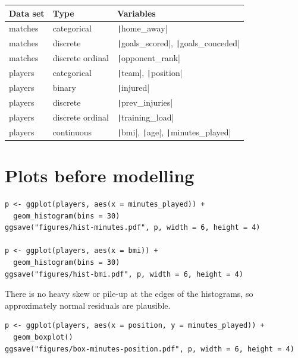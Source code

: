 \documentclass[12pt,notitlepage]{report}
\begin{document}
\begin{center}
  \begin{tabular}{lll}
    Data set & Type & Variables \\
    \toprule
    matches & categorical      & \texttt|home_away| \\
    matches & discrete         & \texttt|goals_scored|, \texttt|goals_conceded| \\
    matches & discrete ordinal & \texttt|opponent_rank| \\
    players & categorical      & \texttt|team|, \texttt|position| \\
    players & binary           & \texttt|injured| \\
    players & discrete         & \texttt|prev_injuries| \\
    players & discrete ordinal & \texttt|training_load| \\
    players & continuous       & \texttt|bmi|, \texttt|age|, \texttt|minutes_played| \\
  \end{tabular}
\end{center}

\section{Plots before modelling}

\begin{verbatim}
p <- ggplot(players, aes(x = minutes_played)) +
  geom_histogram(bins = 30)
ggsave("figures/hist-minutes.pdf", p, width = 6, height = 4)

p <- ggplot(players, aes(x = bmi)) +
  geom_histogram(bins = 30)
ggsave("figures/hist-bmi.pdf", p, width = 6, height = 4)
\end{verbatim}



There is no heavy skew or pile-up at the edges of the histograms, so
approximately normal residuals are plausible.

\begin{verbatim}
p <- ggplot(players, aes(x = position, y = minutes_played)) +
  geom_boxplot()
ggsave("figures/box-minutes-position.pdf", p, width = 6, height = 4)
\end{verbatim}

\end{document}

